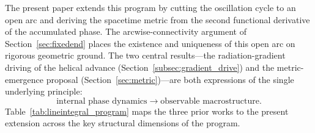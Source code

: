 \documentclass[%
 reprint, amsmath,amssymb, aps, prb, ]{revtex4-2}
\numberwithin{equation}{section}
\begin{document}
The present paper extends this program by cutting the oscillation cycle to an open arc and deriving the spacetime metric from the second functional derivative of the accumulated phase. The arcwise-connectivity argument of Section~\ref{sec:fixedend} places the existence and uniqueness of this open arc on rigorous geometric ground. The two central results---the radiation-gradient driving of the helical advance (Section~\ref{subsec:gradient_drive}) and the metric-emergence proposal (Section~\ref{sec:metric})---are both expressions of the single underlying principle:
\begin{equation}
\text{internal phase dynamics} \;\longrightarrow\; \text{observable macrostructure.}
\label{eq:unified_principle}
\end{equation}
Table~\ref{tab:lineintegral_program} maps the three prior works to the present extension across the key structural dimensions of the program.
\end{document}
